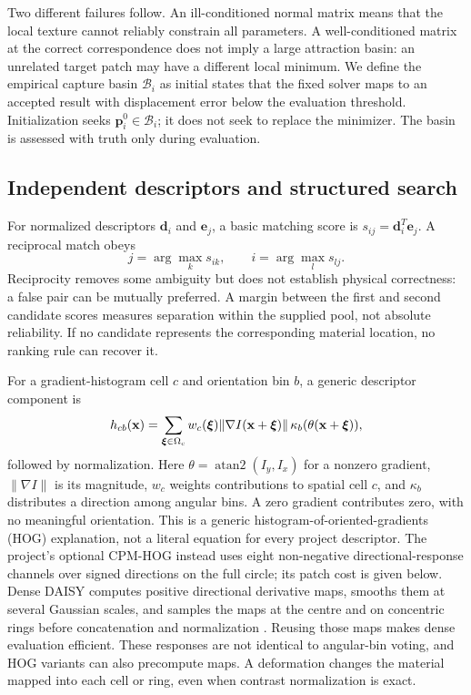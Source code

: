 Two different failures follow. An ill-conditioned normal matrix means that the local texture cannot reliably constrain all parameters. A well-conditioned matrix at the correct correspondence does not imply a large attraction basin: an unrelated target patch may have a different local minimum. We define the empirical capture basin $\mathcal B_i$ as initial states that the fixed solver maps to an accepted result with displacement error below the evaluation threshold. Initialization seeks $\mathbf p_i^0\in\mathcal B_i$; it does not seek to replace the minimizer. The basin is assessed with truth only during evaluation.

\subsection{Independent descriptors and structured search}
For normalized descriptors $\mathbf d_i$ and $\mathbf e_j$, a basic matching score is $s_{ij}=\mathbf d_i^T\mathbf e_j$. A reciprocal match obeys
\begin{equation}
j=\arg\max_k s_{ik},\qquad i=\arg\max_l s_{lj}.
\end{equation}
Reciprocity removes some ambiguity but does not establish physical correctness: a false pair can be mutually preferred. A margin between the first and second candidate scores measures separation within the supplied pool, not absolute reliability. If no candidate represents the corresponding material location, no ranking rule can recover it.

For a gradient-histogram cell $c$ and orientation bin $b$, a generic descriptor component is
\begin{equation}
h_{cb}(\mathbf x)=\sum_{\boldsymbol\xi\in\Omega_c}w_c(\boldsymbol\xi)
\|\nabla I(\mathbf x+\boldsymbol\xi)\|\,\kappa_b(\theta(\mathbf x+\boldsymbol\xi)),
\end{equation}
followed by normalization. Here $\theta=\operatorname{atan2}(I_y,I_x)$ for a nonzero gradient, $\|\nabla I\|$ is its magnitude, $w_c$ weights contributions to spatial cell $c$, and $\kappa_b$ distributes a direction among angular bins. A zero gradient contributes zero, with no meaningful orientation. This is a generic histogram-of-oriented-gradients (HOG) explanation, not a literal equation for every project descriptor. The project's optional CPM-HOG instead uses eight non-negative directional-response channels over signed directions on the full circle; its patch cost is given below. Dense DAISY computes positive directional derivative maps, smooths them at several Gaussian scales, and samples the maps at the centre and on concentric rings before concatenation and normalization \citep{daisy}. Reusing those maps makes dense evaluation efficient. These responses are not identical to angular-bin voting, and HOG variants can also precompute maps. A deformation changes the material mapped into each cell or ring, even when contrast normalization is exact.

